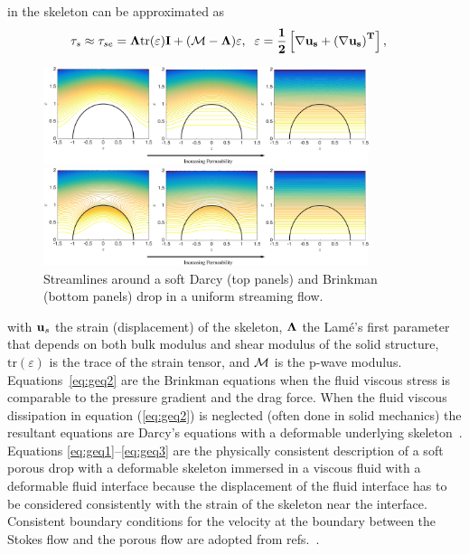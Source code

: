 \documentclass[11pt]{article}
\begin{document}
in the skeleton can be approximated as
\begin{align}
\tau_s &\approx \tau_{se} = \bf{\Lambda}\mbox{tr}(\bf{\varepsilon}) \bf{I} + ({\cal M}-\Lambda) \bf{\varepsilon},\;\; 
{\bf \varepsilon} = \frac{1}{2}\left[\nabla {\bf u}_s + \left(\nabla {\bf u}_s\right)^T\right],
\end{align}
%
\begin{figure}
\centerline{\includegraphics[width=3.75in]{figs/DarcyDropUFlow0927aa.pdf}}
\smallskip\par
\centerline{\includegraphics[width=3.75in]{figs/BrinkmanDropUFlow0927aa.pdf}}
\vspace{-7pt}
\caption{\label{fig:DarcyDropUFlow0927} Streamlines around a soft Darcy
  (top panels) and Brinkman (bottom panels) drop in a uniform streaming
  flow.}
\end{figure}
%
with ${\bf u}_s$ the strain (displacement) of the skeleton, ${\bf
\Lambda}$ the Lam\'e's first parameter that depends on both bulk modulus
and shear modulus of the solid structure, $\mbox{tr}(\varepsilon)$ is
the trace of the strain tensor, and ${\cal M}$ is the p-wave modulus.
Equations~\eqref{eq:geq2} are the Brinkman equations when the fluid
viscous stress is comparable to the pressure gradient and the drag
force.  When the fluid viscous dissipation in equation (\ref{eq:geq2})
is neglected (often done in solid mechanics) the resultant equations are
Darcy's equations with a deformable underlying
skeleton~\cite{MacMinn2016_PRApplied}. Equations
\eqref{eq:geq1}--\eqref{eq:geq3} are the physically consistent
description of a soft porous drop with a deformable skeleton immersed in
a viscous fluid with a deformable fluid interface because the
displacement of the fluid interface has to be considered consistently
with the strain of the skeleton near the interface. Consistent boundary
conditions for the velocity at the boundary between the Stokes flow and
the porous flow are adopted from refs.~\cite{Angot2017_PRE,
MacMinn2016_PRApplied}.
\end{document}
